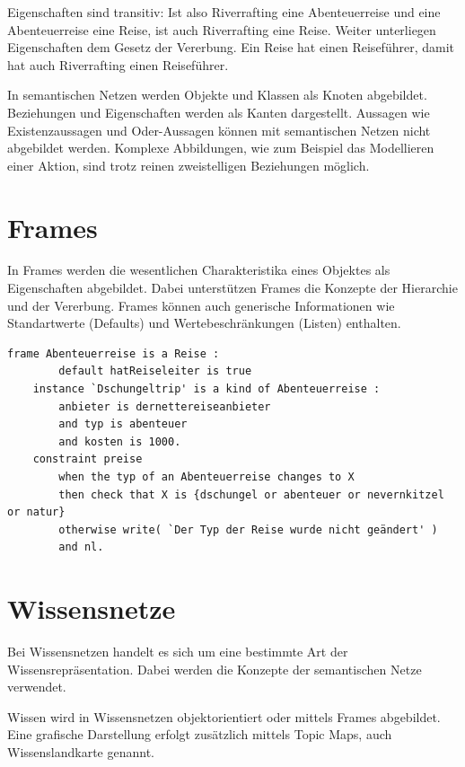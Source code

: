 Eigenschaften sind transitiv: Ist also Riverrafting eine Abenteuerreise und eine Abenteuerreise eine Reise, ist auch Riverrafting eine Reise. Weiter unterliegen Eigenschaften dem Gesetz der Vererbung. Ein Reise hat einen Reiseführer, damit hat auch Riverrafting einen Reiseführer.

In semantischen Netzen werden Objekte und Klassen als Knoten abgebildet. Beziehungen und Eigenschaften werden als Kanten dargestellt.
Aussagen wie Existenzaussagen und Oder-Aussagen können mit semantischen Netzen nicht abgebildet werden.
Komplexe Abbildungen, wie zum Beispiel das Modellieren einer Aktion, sind trotz reinen zweistelligen Beziehungen möglich.

\section{Frames}
\label{sec:wissensrepFormen_frames}

In Frames werden die wesentlichen Charakteristika eines Objektes als Eigenschaften abgebildet. Dabei unterstützen Frames die Konzepte der Hierarchie und der Vererbung. Frames können auch generische Informationen wie Standartwerte (Defaults) und Wertebeschränkungen (Listen) enthalten.

\begin{lstlisting}[caption={Beispiel eines Frames anhand einer Reise.}]
    frame Abenteuerreise is a Reise :
        default hatReiseleiter is true
    instance `Dschungeltrip' is a kind of Abenteuerreise :
        anbieter is dernettereiseanbieter
        and typ is abenteuer
        and kosten is 1000.
    constraint preise
        when the typ of an Abenteuerreise changes to X
        then check that X is {dschungel or abenteuer or nevernkitzel or natur}
        otherwise write( `Der Typ der Reise wurde nicht geändert' )
        and nl.
\end{lstlisting}

\section{Wissensnetze}
\label{sec:wissensrepFormen_Wissensnetze}
Bei Wissensnetzen handelt es sich um eine bestimmte Art der Wissensrepräsentation. Dabei werden die Konzepte der semantischen Netze verwendet.

Wissen wird in Wissensnetzen objektorientiert oder mittels Frames abgebildet. Eine grafische Darstellung erfolgt zusätzlich mittels Topic Maps, auch Wissenslandkarte genannt.


